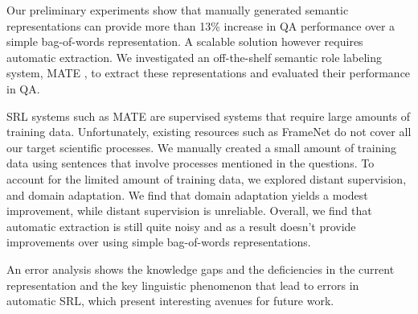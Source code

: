 Our preliminary experiments show that manually generated semantic representations can provide more than 13\% increase in QA performance over a simple bag-of-words representation.
A scalable solution however requires automatic extraction. 
We investigated an off-the-shelf semantic role labeling system, MATE \cite{bjorkelund2009multilingual}, to extract these representations and 
evaluated their performance in QA.

SRL systems such as MATE are supervised systems that require large amounts of training data. 
Unfortunately, existing resources such as FrameNet do not cover all our target scientific processes. 
We manually created a small amount of training data using sentences that involve processes mentioned in the questions. 
To account for the limited amount of training data, we explored distant supervision, and domain adaptation.
We find that domain adaptation yields a modest improvement, while distant supervision is unreliable. 
Overall, we find that automatic extraction is still quite noisy and as a result doesn't provide improvements over
using simple bag-of-words representations. 

An error analysis shows the knowledge gaps and the deficiencies in the current representation and the key linguistic
phenomenon that lead to errors in automatic SRL, which present interesting avenues for future work. 





